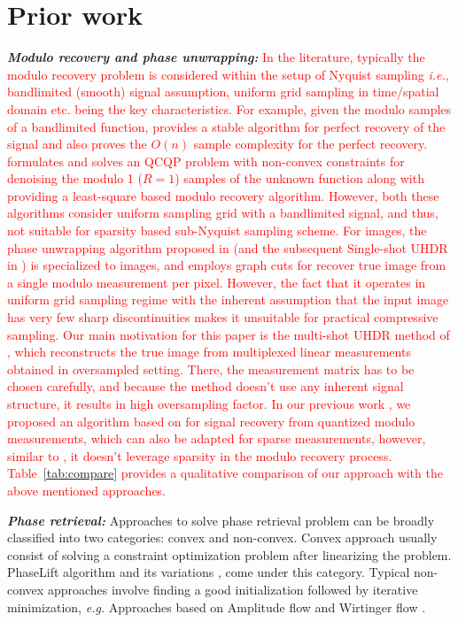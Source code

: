 \section{Prior work}
\label{sec:prior}
\emph{\textbf{Modulo recovery and phase unwrapping:}} \textcolor{red}{In the literature, typically the modulo recovery problem is considered within the setup of Nyquist sampling \textit{i.e.}, bandlimited (smooth) signal assumption, uniform grid sampling in time/spatial domain etc. being the key characteristics. For example, given the modulo samples of a bandlimited function, \cite{Bhandari} provides a stable algorithm for perfect recovery of the signal and also proves the $O(n)$ sample complexity for the perfect recovery. \cite{Cucuringu2017} formulates and solves an QCQP problem with non-convex constraints for denoising the modulo 1 ($R =1$) samples of the unknown function along with providing a least-square based modulo recovery algorithm. However, both these algorithms consider uniform sampling grid with a bandlimited signal, and thus, not suitable for sparsity based sub-Nyquist sampling scheme. For images, the phase unwrapping algorithm proposed in \cite{bioucas2007phase} (and the subsequent Single-shot UHDR in \cite{ICCP15_Zhao}) is specialized to images, and employs graph cuts for recover true image from a single modulo measurement per pixel. However, the fact that it operates in uniform grid sampling regime with the inherent assumption that the input image has very few sharp discontinuities makes it unsuitable for practical compressive sampling. Our main motivation for this paper is the multi-shot UHDR method of \cite{ICCP15_Zhao}, which reconstructs the true image from multiplexed linear measurements obtained in oversampled setting. There, the measurement matrix has to be chosen carefully, and because the method doesn't use any inherent signal structure, it results in high oversampling factor. In our previous work \cite{Shah}, we proposed an algorithm based on \cite{ICCP15_Zhao, soltani2017stable} for signal recovery from quantized modulo measurements, which can also be adapted for sparse measurements, however, similar to \cite{ICCP15_Zhao}, it doesn't leverage sparsity in the modulo recovery process. Table~\ref{tab:compare} provides a qualitative comparison of our approach with the above mentioned approaches.}

\emph{\textbf{Phase retrieval:}} Approaches to solve phase retrieval problem can be broadly classified into two categories: convex and non-convex. 
Convex approach usually consist of solving a constraint optimization problem after linearizing the problem. PhaseLift algorithm \cite{candes2013phaselift} and its variations \cite{gross2017improved}, \cite{candes2015phasediff} come under this category. Typical non-convex approaches involve finding a good initialization followed by iterative minimization, \textit{e.g.} Approaches based on Amplitude flow \cite{wang2016sparse,wang2016solving} and Wirtinger flow \cite{candes2015phase, zhang2016reshaped,  chen2015solving, cai2016optimal}.

